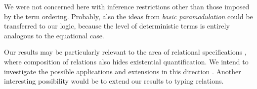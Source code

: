 We were not concerned here with inference restrictions other than those
imposed by the term ordering.  Probably, also the ideas from {\em basic
paramodulation} \cite{Basic-par} could be transferred to our logic, because
the level of deterministic terms is entirely analogous to the equational
case.

Our results may be particularly relevant to the area of relational
specifications \cite {rel-spec}, where composition of relations also hides
existential quantification.  We intend to investigate the possible
applications and extensions in this direction \cite {KMW}.  Another
interesting possibility would be to extend our results to typing relations.

